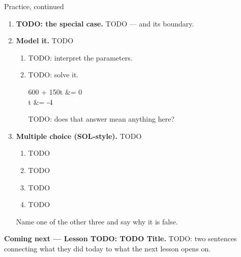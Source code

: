 \documentclass[12pt]{article}
\begin{document}
\newpage
\begin{notesbox}{Practice, continued}
\small
\begin{enumerate}[leftmargin=1.9em, itemsep=8pt, start=4]
  \item \textbf{TODO: the special case.} TODO --- and its boundary.

  \boxguard[20]
  \item \textbf{Model it.} TODO
    \begin{enumerate}[label=(\alph*), leftmargin=1.9em, itemsep=4pt]
      \item TODO: interpret the parameters. \blank{4.0cm}
      \item TODO: solve it.
        \begin{work}
          600 + 150t &= 0 \\
                   t &= -4
        \end{work}
        TODO: does that answer mean anything here? 
    \end{enumerate}

  \item \textbf{Multiple choice (SOL-style).} TODO
    \begin{enumerate}[label=(\Alph*), leftmargin=2.0em, itemsep=1pt]
      \item TODO
      \item TODO
      \item TODO
      \item TODO
    \end{enumerate}
    Name one of the other three and say why it is false. 
\end{enumerate}
\end{notesbox}

\boxguard[8]
\begin{spiralbox}
\textbf{Coming next --- Lesson TODO: TODO Title.} TODO: two sentences connecting what they did
today to what the next lesson opens on.
\end{spiralbox}
\end{document}
